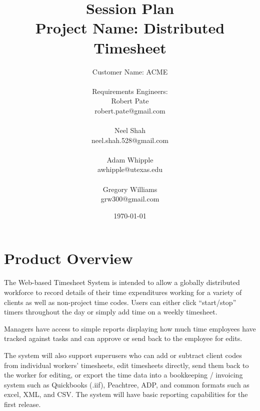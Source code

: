 \documentclass[12pt]{article}
\begin{document}
\begin{titlepage}
\title{{\Huge Session Plan}\\
	{\huge \color{cyan}Project Name: Distributed Timesheet}}
\author{{\huge{\color{blue}Customer Name: ACME}}\\
	\\{\small Requirements Engineers:}
\\Robert Pate\\robert.pate@gmail.com\\\\Neel Shah\\neel.shah.528@gmail.com\\\\Adam Whipple\\awhipple@utexas.edu\\\\Gregory Williams\\grw300@gmail.com}
\date{\today}



\maketitle
\vfill
\end{titlepage}

\section{Product Overview}

The Web-based Timesheet System is intended to allow a globally distributed workforce to record details of their time expenditures working for a variety of clients as well as non-project time codes.  Users can either click “start/stop” timers throughout the day or simply add time on a weekly timesheet.

Managers have access to simple reports displaying how much time employees have tracked against tasks and can approve or send back to the employee for edits.

The system will also support superusers who can add or subtract client codes from individual workers’ timesheets, edit timesheets directly, send them back to the worker for editing, or export the time data into a bookkeeping / invoicing system such as Quickbooks (.iif), Peachtree, ADP, and common formats such as excel, XML, and CSV. The system will have basic reporting capabilities for the first release.
\end{document}
